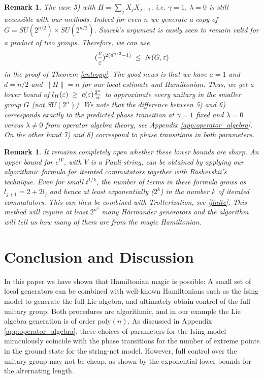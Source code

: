 \documentclass[12pt, a4-paper]{amsart}
\numberwithin{equation}{section}
\newcommand{\kl}{\pl \le \pl}
\newcommand{\gl}{\pl \ge \pl}
\newcommand{\pl}{\hspace{.1cm}}
\newcommand{\la}{\lambda}
\newcommand{\eps}{\varepsilon}
\newtheorem{rem}[lemma]{Remark}
\begin{document}
\begin{rem} The case 5) with $H=\sum_j X_jX_{j+1}$, i.e. $\gamma=1$, $\la=0$ is still accessible with our methods. Indeed for even $n$ we generate a copy of $G=SU(2^{n/2})\times SU(2^{n/2})$. Szarek's argument is easily seen to remain valid for a product of two groups. Therefore, we can use 
 \[ (\frac{c}{\eps})^{2(4^{n/2}-1)} \kl N(G,\eps) \]
in the proof of Theorem \ref{entropy}. The good news is that we have $a=1$ and $d=n/2$ and $\|H\|=n$ for our local estimate and Hamiltonian. Thus, we get a lower bound of $l_H(\eps)\gl c(\eps) \frac{2^n}{n}$ to approximate every unitary in the smaller group $G$ (not $SU(2^n)$). We note that the difference between 5) and 6) corresponds exactly to the predicted phase transition at $\gamma=1$ fixed  and  $\la=0$ versus $\la\neq 0$ from operator algebra theory, see Appendix \ref{app:operator_algebra}. 
On the other hand 7) and 8) correspond to phase transitions in both parameters.
\end{rem}


\begin{rem} It remains completely open whether these lower bounds are sharp. An upper bound for $e^{tV}$, with $V$ is a Pauli string, can be obtained by applying our algorithmic formula for iterated commutators together with Rashevskii's technique. Even for small $t^{1/k}$, the number of terms in these formula grows as $l_{j+1}=2+2l_j$ and hence at least exponentially ($2^k$) in the number $k$ of iterated commutators. This can then be combined with Trotterization, see \ref{finite}.  This method will require at least $2^{n^3}$ many H\"ormander generators and the algorithm will tell us how many of them are from the magic Hamiltonian.      
\end{rem}


\section{Conclusion and Discussion}\label{sec:conclusion}
In this paper we have shown that Hamiltonian magic is possible: A small set of local generators can be combined with well-known Hamiltonians such as the Ising model to generate the full Lie algebra, and ultimately obtain control of the full unitary group. Both procedures are algorithmic, and in our example the Lie algebra generation is of order poly$(n)$. 
As discussed in Appendix \ref{app:operator_algebra}, these choices of parameters for the Ising model miraculously coincide with the phase transitions for the number of extreme points in the ground state for the string-net model.  However, full control over the unitary group may not be cheap, as shown by the exponential lower bounds for the alternating length.  
\end{document}
